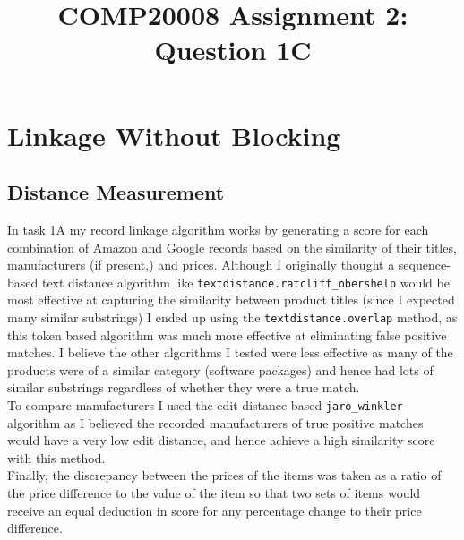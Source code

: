\documentclass{article}
\title{\vspace{-1cm}COMP20008 Assignment 2: Question 1C\vspace{-1cm}}
\date{}
\begin{document}
\maketitle
\thispagestyle{fancy}
\section*{Linkage Without Blocking}
\subsection*{Distance Measurement}
In task 1A my record linkage algorithm works by generating a score for each combination of Amazon and Google records based on the similarity of their titles, manufacturers (if present,) and prices. Although I originally thought a sequence-based text distance algorithm like \verb|textdistance.ratcliff_obershelp| would be most effective at capturing the similarity between product titles (since I expected many similar substrings) I ended up using the \verb|textdistance.overlap| method, as this token based algorithm was much more effective at eliminating false positive matches. I believe the other algorithms I tested were less effective as many of the products were of a similar category (software packages) and hence had lots of similar substrings regardless of whether they were a true match.\\[2mm]
To compare manufacturers I used the edit-distance based \verb|jaro_winkler| algorithm as I believed the recorded manufacturers of true positive matches would have a very low edit distance, and hence achieve a high similarity score with this method.\\[2mm]
Finally, the discrepancy between the prices of the items was taken as a ratio of the price difference to the value of the item so that two sets of items would receive an equal deduction in score for any percentage change to their price difference.
\end{document}
